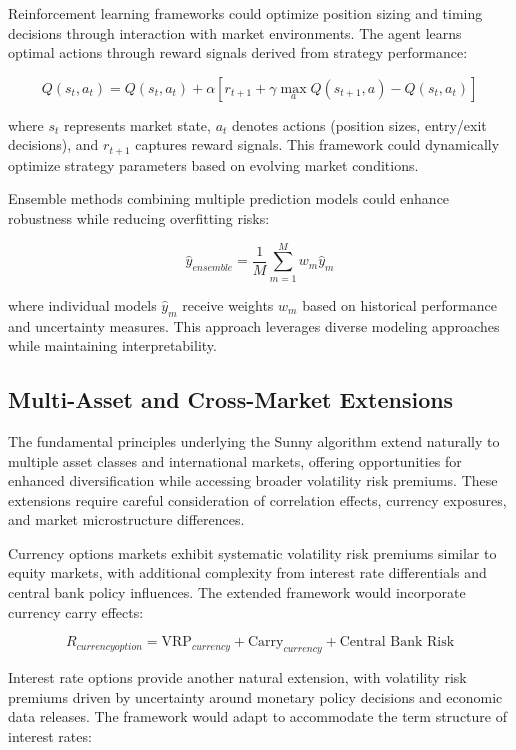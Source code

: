 \documentclass[
  american,
  11pt,
  11pt,
  letterpaper,
  onecolumn]{article}
\begin{document}
Reinforcement learning frameworks could optimize position sizing and
timing decisions through interaction with market environments. The agent
learns optimal actions through reward signals derived from strategy
performance:

\[Q(s_t, a_t) = Q(s_t, a_t) + \alpha[r_{t+1} + \gamma \max_a Q(s_{t+1}, a) - Q(s_t, a_t)]\]

where \(s_t\) represents market state, \(a_t\) denotes actions (position
sizes, entry/exit decisions), and \(r_{t+1}\) captures reward signals.
This framework could dynamically optimize strategy parameters based on
evolving market conditions.

Ensemble methods combining multiple prediction models could enhance
robustness while reducing overfitting risks:

\[\hat{y}_{ensemble} = \frac{1}{M}\sum_{m=1}^{M} w_m \hat{y}_m\]

where individual models \(\hat{y}_m\) receive weights \(w_m\) based on
historical performance and uncertainty measures. This approach leverages
diverse modeling approaches while maintaining interpretability.

\subsection{Multi-Asset and Cross-Market
Extensions}\label{multi-asset-and-cross-market-extensions}

The fundamental principles underlying the Sunny algorithm extend
naturally to multiple asset classes and international markets, offering
opportunities for enhanced diversification while accessing broader
volatility risk premiums. These extensions require careful consideration
of correlation effects, currency exposures, and market microstructure
differences.

Currency options markets exhibit systematic volatility risk premiums
similar to equity markets, with additional complexity from interest rate
differentials and central bank policy influences. The extended framework
would incorporate currency carry effects:

\[R_{currency option} = \text{VRP}_{currency} + \text{Carry}_{currency} + \text{Central Bank Risk}\]

Interest rate options provide another natural extension, with volatility
risk premiums driven by uncertainty around monetary policy decisions and
economic data releases. The framework would adapt to accommodate the
term structure of interest rates:
\end{document}
